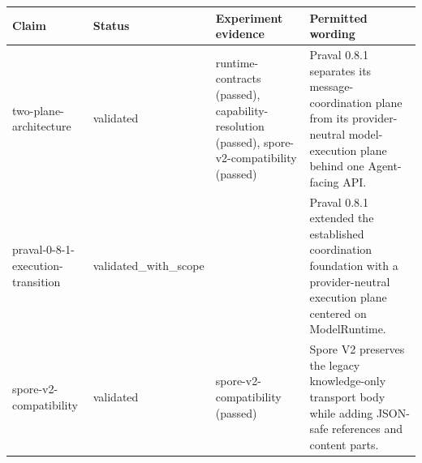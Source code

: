 \begin{tabular}{llll}
\hline
Claim & Status & Experiment evidence & Permitted wording \\
\hline
two-plane-architecture & validated & runtime-contracts (passed), capability-resolution (passed), spore-v2-compatibility (passed) & Praval 0.8.1 separates its message-coordination plane from its provider-neutral model-execution plane behind one Agent-facing API. \\
praval-0-8-1-execution-transition & validated\_with\_scope &  & Praval 0.8.1 extended the established coordination foundation with a provider-neutral execution plane centered on ModelRuntime. \\
spore-v2-compatibility & validated & spore-v2-compatibility (passed) & Spore V2 preserves the legacy knowledge-only transport body while adding JSON-safe references and content parts. \\
\hline
\end{tabular}
